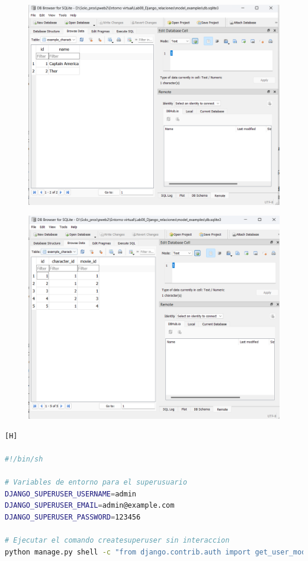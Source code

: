 \documentclass{article}
\begin{document}
	\begin{figure}[H]
		\centering
		\includegraphics[width=1.0\textwidth,keepaspectratio]{img/C4.png}
	\end{figure}
	\begin{figure}[H]
		\centering
		\includegraphics[width=1.0\textwidth,keepaspectratio]{img/C5.png}
	\end{figure}
\begin{lstlisting}[language=bash,caption={Script para crear un superusuario}][H]

#!/bin/sh

# Variables de entorno para el superusuario
DJANGO_SUPERUSER_USERNAME=admin
DJANGO_SUPERUSER_EMAIL=admin@example.com
DJANGO_SUPERUSER_PASSWORD=123456

# Ejecutar el comando createsuperuser sin interaccion
python manage.py shell -c "from django.contrib.auth import get_user_model; User = get_user_model(); User.objects.create_superuser('$DJANGO_SUPERUSER_USERNAME', '$DJANGO_SUPERUSER_EMAIL', '$DJANGO_SUPERUSER_PASSWORD') if not User.objects.filter(username='$DJANGO_SUPERUSER_USERNAME').exists() else print('Superusuario ya existe.')"
	\end{lstlisting}
\end{document}

